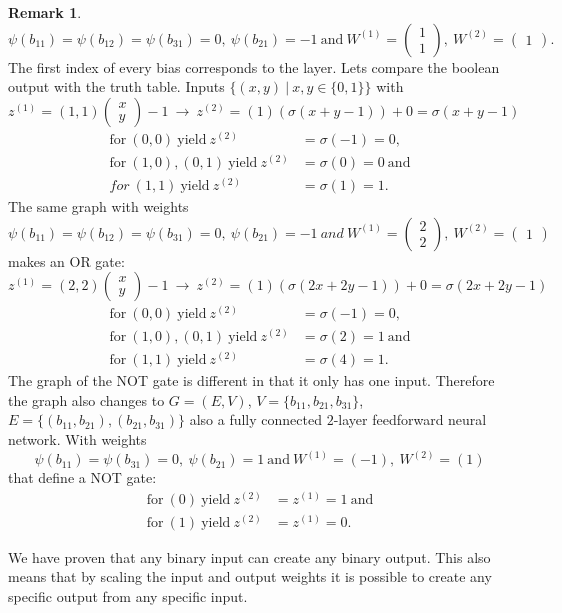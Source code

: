 \documentclass{article}
\theoremstyle{definition}
\newtheorem{remark}[theorem]{Remark}
\begin{document}
\begin{remark}
$$\psi(b_{11})=\psi(b_{12})=\psi(b_{31})=0, \ \psi(b_{21})=-1 \ \text{and} \ W^{(1)}=\begin{pmatrix}1\\1\end{pmatrix}, \ W^{(2)}=\begin{pmatrix}1\end{pmatrix}.$$
The first index of every bias corresponds to the layer. Lets compare the boolean output with the truth table. Inputs $\{(x, y) \ | \ x, y \in \{0, 1\}\}$ with
$$z^{(1)}=(1, 1)\begin{pmatrix}x\\y\end{pmatrix}-1 \ \to \ z^{(2)} = (1)(\sigma(x+y-1))+0 = \sigma(x+y-1)$$
\begin{align*}
\text{for} \ (0, 0) \ \text{yield} \ z^{(2)}&=\sigma(-1)=0, \\
\text{for} \ (1, 0), (0, 1) \ \text{yield} \ z^{(2)}&=\sigma(0)=0 \ \text{and} \\
for \ (1, 1) \ \text{yield} \ z^{(2)}&=\sigma(1)=1.
\end{align*}
The same graph with weights
$$\psi(b_{11})=\psi(b_{12})=\psi(b_{31})=0, \ \psi(b_{21})=-1 \ and \ W^{(1)}=\begin{pmatrix}2\\2\end{pmatrix}, \ W^{(2)}=\begin{pmatrix}1\end{pmatrix}$$
makes an OR gate:
$$z^{(1)}=(2, 2)\begin{pmatrix}x\\y\end{pmatrix}-1 \ \to \ z^{(2)} = (1)(\sigma(2x+2y-1))+0 = \sigma(2x+2y-1)$$
\begin{align*}
\text{for} \ (0, 0) \ \text{yield} \ z^{(2)}&=\sigma(-1)=0, \\
\text{for} \ (1, 0), (0, 1) \ \text{yield} \ z^{(2)}&=\sigma(2)=1 \ \text{and} \\
\text{for} \ (1, 1) \ \text{yield} \ z^{(2)}&=\sigma(4)=1.
\end{align*}
The graph of the NOT gate is different in that it only has one input. Therefore the graph also changes to $G=(E, V)$, $V=\{ b_{11}, b_{21}, b_{31} \}$, $E=\{ (b_{11}, b_{21}), (b_{21}, b_{31})\}$ also a fully connected $2$-layer feedforward neural network. With weights
$$\psi(b_{11})=\psi(b_{31})=0, \ \psi(b_{21})=1 \ \text{and} \ W^{(1)}=(-1), \ W^{(2)}=(1)$$
that define a NOT gate:
\begin{align*}
\text{for} \ (0) \ \text{yield} \ z^{(2)}&= z^{(1)} = 1 \ \text{and} \\
\text{for} \ (1) \ \text{yield} \ z^{(2)}&= z^{(1)} = 0.
\end{align*}

We have proven that any binary input can create any binary output. This also means that by scaling the input and output weights it is possible to create any specific output from any specific input.

\end{remark}
\end{document}
